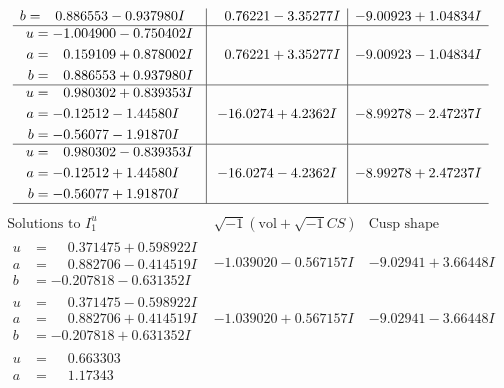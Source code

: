 \documentclass[1p]{elsarticle_modified}
\theoremstyle{definition}
\newcommand{\I}{\sqrt{-1}}
\begin{document}
$$\begin{array}{c|c|c}
\begin{aligned}
b &= \phantom{-}0.886553 - 0.937980 I\end{aligned}
 & \phantom{-}0.76221 - 3.35277 I & -9.00923 + 1.04834 I \\ \hline\begin{aligned}
u &= -1.004900 - 0.750402 I \\
a &= \phantom{-}0.159109 + 0.878002 I \\
b &= \phantom{-}0.886553 + 0.937980 I\end{aligned}
 & \phantom{-}0.76221 + 3.35277 I & -9.00923 - 1.04834 I \\ \hline\begin{aligned}
u &= \phantom{-}0.980302 + 0.839353 I \\
a &= -0.12512 - 1.44580 I \\
b &= -0.56077 - 1.91870 I\end{aligned}
 & -16.0274 + 4.2362 I & -8.99278 - 2.47237 I \\ \hline\begin{aligned}
u &= \phantom{-}0.980302 - 0.839353 I \\
a &= -0.12512 + 1.44580 I \\
b &= -0.56077 + 1.91870 I\end{aligned}
 & -16.0274 - 4.2362 I & -8.99278 + 2.47237 I\\
 \hline 
 \end{array}$$\newpage$$\begin{array}{c|c|c}  
\text{Solutions to }I^u_{1}& \I (\text{vol} + \sqrt{-1}CS) & \text{Cusp shape}\\
 \hline 
\begin{aligned}
u &= \phantom{-}0.371475 + 0.598922 I \\
a &= \phantom{-}0.882706 - 0.414519 I \\
b &= -0.207818 - 0.631352 I\end{aligned}
 & -1.039020 - 0.567157 I & -9.02941 + 3.66448 I \\ \hline\begin{aligned}
u &= \phantom{-}0.371475 - 0.598922 I \\
a &= \phantom{-}0.882706 + 0.414519 I \\
b &= -0.207818 + 0.631352 I\end{aligned}
 & -1.039020 + 0.567157 I & -9.02941 - 3.66448 I \\ \hline\begin{aligned}
u &= \phantom{-}0.663303\phantom{ +0.000000I} \\
a &= \phantom{-}1.17343\phantom{ +0.000000I} \\

\end{aligned}
\end{array}$$
\end{document}
